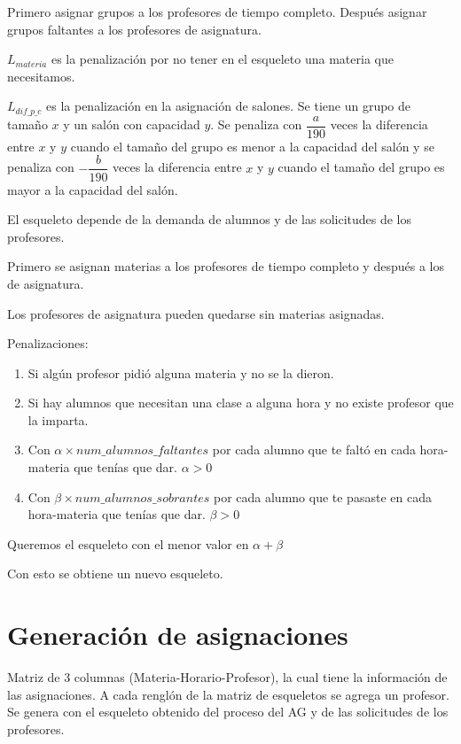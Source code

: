 Primero asignar grupos a los profesores de tiempo completo. Después asignar grupos faltantes a los profesores de asignatura.

$L_{materia}$ es la penalización por no tener en el esqueleto una materia que necesitamos.

$L_{dif\_p\_c}$ es la penalización en la asignación de salones. Se tiene un grupo de tamaño $x$ y un salón con capacidad $y$. Se penaliza con $\dfrac{a}{190}$ veces la diferencia entre $x$ y $y$ cuando el tamaño del grupo es menor a la capacidad del salón y se penaliza con $-\dfrac{b}{190}$ veces la diferencia entre $x$ y $y$ cuando el tamaño del grupo es mayor a la capacidad del salón.

El esqueleto depende de la demanda de alumnos y de las solicitudes de los profesores.

Primero se asignan materias a los profesores de tiempo completo y después a los de asignatura.

Los profesores de asignatura pueden quedarse sin materias asignadas.

Penalizaciones:

\begin{enumerate}
\item Si algún profesor pidió alguna materia y no se la dieron.

\item Si hay alumnos que necesitan una clase a alguna hora y no existe profesor que la imparta.

\item Con $\alpha \times num\_alumnos\_faltantes$ por cada alumno que te faltó en cada hora-materia que tenías que dar. $\alpha > 0$

\item Con $\beta \times num\_alumnos\_sobrantes$ por cada alumno que te pasaste en cada hora-materia que tenías que dar. $\beta > 0$

\end{enumerate}

Queremos el esqueleto con el menor valor en $\alpha + \beta$

Con esto se obtiene un nuevo esqueleto.


\section{Generación de asignaciones}

Matriz de 3 columnas (Materia-Horario-Profesor), la cual tiene la información de las asignaciones. A cada renglón de la matriz de esqueletos se agrega un profesor. Se genera con el esqueleto obtenido del proceso del AG y de las solicitudes de los profesores.

